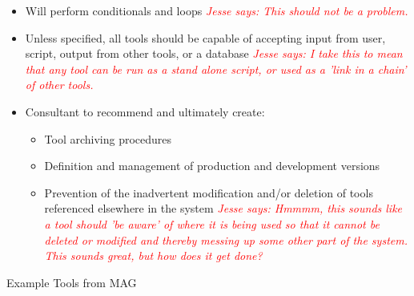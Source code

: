 \documentclass[titlepage]{article}
\begin{document}
\begin{itemize}
	\item Will perform conditionals and loops
		\textcolor{red}{\textit{Jesse says: This should not be a problem.}}
	\item Unless specified, all tools should be capable of accepting input from user, script, output from other tools, or a database
		\textcolor{red}{\textit{Jesse says: I take this to mean that any tool can be run as a stand alone script, or used as a 'link in a chain' of other tools.}}
	\item Consultant to recommend and ultimately create:
		\begin{itemize}
			\item Tool archiving procedures
			\item Definition and management of production and development versions
			\item Prevention of the inadvertent modification and/or deletion of tools referenced elsewhere in the system
				\textcolor{red}{\textit{Jesse says: Hmmmm, this sounds like a tool should 'be aware' of where it is being used so that it cannot be deleted or modified and thereby messing up some other part of the system.  This sounds great, but how does it get done?}}
		\end{itemize}
\end{itemize}
Example Tools from MAG
\end{document}

